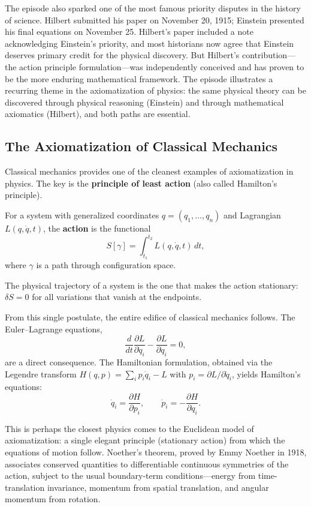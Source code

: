 The episode also sparked one of the most famous priority disputes in the history of science. Hilbert submitted his paper on November 20, 1915; Einstein presented his final equations on November 25. Hilbert's paper included a note acknowledging Einstein's priority, and most historians now agree that Einstein deserves primary credit for the physical discovery. But Hilbert's contribution---the action principle formulation---was independently conceived and has proven to be the more enduring mathematical framework. The episode illustrates a recurring theme in the axiomatization of physics: the same physical theory can be discovered through physical reasoning (Einstein) and through mathematical axiomatics (Hilbert), and both paths are essential.

\subsection{The Axiomatization of Classical Mechanics}

Classical mechanics provides one of the cleanest examples of axiomatization in physics. The key is the \textbf{principle of least action} (also called Hamilton's principle).

\begin{definition}[Action]
For a system with generalized coordinates $q = (q_1, \ldots, q_n)$ and Lagrangian $L(q, \dot{q}, t)$, the \textbf{action} is the functional
\[
S[\gamma] = \int_{t_1}^{t_2} L(q, \dot{q}, t) \, dt,
\]
where $\gamma$ is a path through configuration space.
\end{definition}

\begin{theorem}\label{thm:hamilton}
The physical trajectory of a system is the one that makes the action stationary: $\delta S = 0$ for all variations that vanish at the endpoints.
\end{theorem}

From this single postulate, the entire edifice of classical mechanics follows. The Euler--Lagrange equations,
\[
\frac{d}{dt}\frac{\partial L}{\partial \dot{q}_i} - \frac{\partial L}{\partial q_i} = 0,
\]
are a direct consequence. The Hamiltonian formulation, obtained via the Legendre transform $H(q,p) = \sum_i p_i \dot{q}_i - L$ with $p_i = \partial L / \partial \dot{q}_i$, yields Hamilton's equations:
\[
\dot{q}_i = \frac{\partial H}{\partial p_i}, \qquad \dot{p}_i = -\frac{\partial H}{\partial q_i}.
\]

This is perhaps the closest physics comes to the Euclidean model of axiomatization: a single elegant principle (stationary action) from which the equations of motion follow. Noether's theorem, proved by Emmy Noether in 1918, associates conserved quantities to differentiable continuous symmetries of the action, subject to the usual boundary-term conditions---energy from time-translation invariance, momentum from spatial translation, and angular momentum from rotation.

